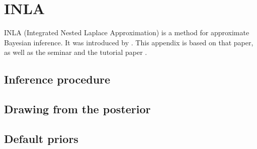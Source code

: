 \documentclass[thesis.tex]{subfiles}
\begin{document}
\chapter{INLA} \label{transmission:sec:INLA}

INLA (Integrated Nested Laplace Approximation) is a method for approximate Bayesian inference.
It was introduced by \textcite{rueINLA}.
This appendix is based on that paper, as well as the seminar \textcite{rueINLAseminar} and the tutorial paper \textcite{martinoINLAtutorial}.

\section{Inference procedure} \label{transmission:sec:INLA:inference}

\section{Drawing from the posterior} \label{transmission:sec:INLA:posterior}

\section{Default priors} \label{transmission:sec:INLA:priors}
\end{document}
